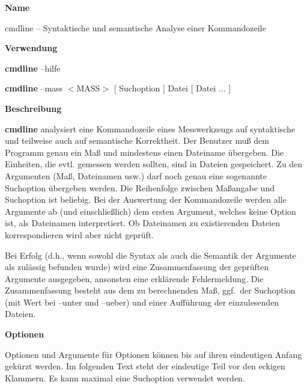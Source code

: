 
\textbf{\large Name}

cmdline -- Syntaktische und semantische Analyse einer Kommandozeile


\medskip
\textbf{\large Verwendung}

{\bf cmdline} --hilfe

{\bf cmdline} --mass $<$MASS$>$ [ Suchoption ] Datei [ Datei ... ]


\medskip
\textbf{\large Beschreibung}

{\bf cmdline} analysiert eine Kommandozeile eines Messwerkzeugs auf
syntaktische und teilweise auch auf semantische Korrektheit. 
Der Benutzer mu{\ss} dem Programm genau ein Ma{\ss} und mindestens
einen Dateiname \"ubergeben.
Die Einheiten, die evtl. gemessen werden sollten, sind in Dateien
gespeichert. 
Zu den Argumenten (Ma{\ss}, Dateinamen usw.) darf noch genau eine
sogenannte Suchoption \"ubergeben werden.
Die Reihenfolge zwischen Ma{\ss}angabe und Suchoption ist beliebig.
Bei der Auswertung der Kommandozeile werden alle Argumente ab 
(und einschlie{\ss}lich) dem ersten Argument, welches keine Option ist,
als Dateinamen interpretiert.  
Ob Dateinamen zu existierenden Dateien korrespondieren wird aber nicht
gepr\"uft. 

Bei Erfolg (d.h., wenn sowohl die Syntax als auch die Semantik der
Argumente als zul\"assig befunden wurde) wird eine Zusammenfassung der
gepr\"uften Argumente ausgegeben, ansonsten eine erkl\"arende
Fehlermeldung.  Die Zusammenfassung besteht aus dem zu 
berechnenden Ma{\ss}, ggf.\ der Suchoption (mit Wert bei --unter und
--ueber) und einer Auff\"uhrung der einzulesenden Dateien.


\medskip
\textbf{\large Optionen}

Optionen und Argumente f\"ur Optionen k\"onnen bis auf ihren eindeutigen
Anfang gek\"urzt werden. 
Im folgenden Text steht der eindeutige Teil vor den eckigen Klammern.
Es kann maximal eine Suchoption verwendet werden. 


